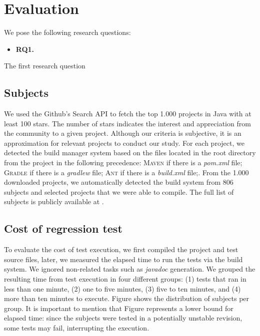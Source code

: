 \section{Evaluation}

We pose the following research questions:

\newcommand{\RQONE}{\textbf{RQ1.}}
\newcommand{\rqOne}{\RQONE{}~}

\begin{itemize}
    \item \rqOne
\end{itemize}

The first research question 

\subsection{Subjects}
\label{sec:subjects}

We used the Github's Search API to fetch the top 1.000 projects in
Java with at least 100 stars. The number of stars indicates the
interest and appreciation from the community to a given project.
 Although our
criteria is subjective, it is an approximation for relevant projects
to conduct our study. For each project, we detected the build manager
system based on the files located in the root directory from the
project in the following precedence: \textsc{Maven} if there is a
\emph{pom.xml} file; \textsc{Gradle} if there is a \emph{gradlew}
file; \textsc{Ant} if there is a \emph{build.xml} file;. From the
1.000 downloaded projects, we automatically detected the build system
from 806 subjects and selected  projects that we were able to
compile.  The full list of subjects is publicly available at
.

\subsection{Cost of regression test}
\label{sec:timecost}

To evaluate the cost of test execution, we first compiled the project
and test source files, later, we measured the elapsed time to run the
tests via the build system. We ignored non-related tasks such as
\emph{javadoc} generation.  We grouped the resulting time from test
execution in four different groups: (1) tests that ran in less than
one minute, (2) one to five minutes, (3) five to ten minutes, and (4)
more than ten minutes to execute. Figure  shows the
distribution of subjects per group. It is important to mention that
Figure  represents a lower bound for elapsed time: since the
subjects were tested in a potentially unstable revision, some tests
may fail, interrupting the execution.


